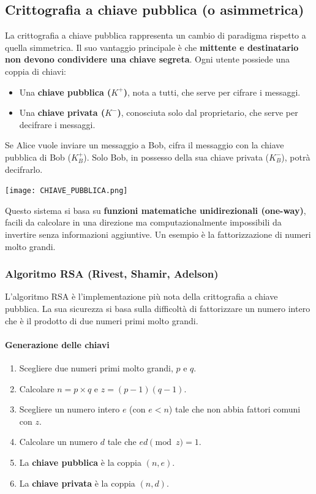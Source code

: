 \subsection{Crittografia a chiave pubblica (o asimmetrica)}

La crittografia a chiave pubblica rappresenta un cambio di paradigma rispetto a quella simmetrica. Il suo vantaggio principale è che \textbf{mittente e destinatario non devono condividere una chiave segreta}. Ogni utente possiede una coppia di chiavi:
\begin{itemize}
    \item Una \textbf{chiave pubblica ($K^+$)}, nota a tutti, che serve per cifrare i messaggi.
    \item Una \textbf{chiave privata ($K^-$)}, conosciuta solo dal proprietario, che serve per decifrare i messaggi.
\end{itemize}
Se Alice vuole inviare un messaggio a Bob, cifra il messaggio con la chiave pubblica di Bob ($K_B^+$). Solo Bob, in possesso della sua chiave privata ($K_B^-$), potrà decifrarlo.
\begin{center}
    \texttt{[image: CHIAVE\_PUBBLICA.png]}
\end{center}
Questo sistema si basa su \textbf{funzioni matematiche unidirezionali (one-way)}, facili da calcolare in una direzione ma computazionalmente impossibili da invertire senza informazioni aggiuntive. Un esempio è la fattorizzazione di numeri molto grandi.

\subsubsection{Algoritmo RSA (Rivest, Shamir, Adelson)}
L'algoritmo RSA è l'implementazione più nota della crittografia a chiave pubblica. La sua sicurezza si basa sulla difficoltà di fattorizzare un numero intero che è il prodotto di due numeri primi molto grandi.

\paragraph{Generazione delle chiavi}
\begin{enumerate}
    \item Scegliere due numeri primi molto grandi, $p$ e $q$.
    \item Calcolare $n = p \times q$ e $z = (p-1)(q-1)$.
    \item Scegliere un numero intero $e$ (con $e < n$) tale che non abbia fattori comuni con $z$.
    \item Calcolare un numero $d$ tale che $ed \pmod z = 1$.
    \item La \textbf{chiave pubblica} è la coppia $(n, e)$.
    \item La \textbf{chiave privata} è la coppia $(n, d)$.
\end{enumerate}

